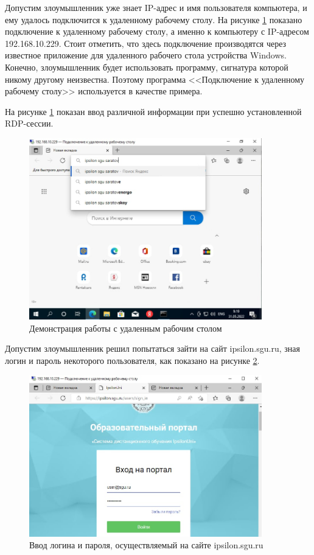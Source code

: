 \documentclass[bachelor, och, coursework]{SCWorks}
\begin{document}
  Допустим злоумышленник уже знает IP-адрес и имя пользователя компьютера, и ему удалось подключится к удаленному рабочему столу. На рисунке \ref{input1} показано
  подключение к удаленному рабочему столу, а именно к компьютеру с IP-адресом 192.168.10.229. Стоит отметить, что здесь подключение производятся через
  известное приложение для удаленного рабочего стола устройства Windows. Конечно, злоумышленник будет использовать программу, сигнатура которой никому другому
  неизвестна. Поэтому программа <<Подключение к удаленному рабочему столу>> используется в качестве примера.

  На рисунке \ref{input1} показан ввод различной информации при успешно установленной RDP-сессии.

  \begin{figure}[H]
    \centering
    \includegraphics[width=0.9\textwidth]{photo/input1.png}
    \caption{Демонстрация работы с удаленным рабочим столом}
    \label{input1}
  \end{figure}


  Допустим злоумышленник решил попытаться зайти на сайт ipsilon.sgu.ru, зная логин и пароль некоторого пользователя, как показано на рисунке \ref{input2}.

  \begin{figure}[H]
    \centering
    \includegraphics[width=0.9\textwidth]{photo/input2.png}
    \caption{Ввод логина и пароля, осуществляемый на сайте ipsilon.sgu.ru}
    \label{input2}
  \end{figure}
\end{document}
